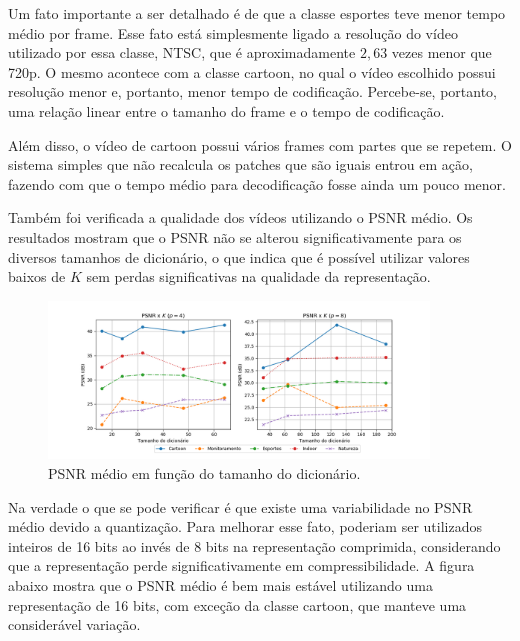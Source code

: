 \documentclass[cic,tc]{iiufrgs}
\begin{document}
Um fato importante a ser detalhado é de que a classe esportes teve menor tempo médio por frame.
Esse fato está simplesmente ligado a resolução do vídeo utilizado por essa classe, NTSC, que é 
aproximadamente $2,63$ vezes menor que 720p.
O mesmo acontece com a classe cartoon, no qual o vídeo escolhido possui resolução menor e, portanto,
menor tempo de codificação.
Percebe-se, portanto, uma relação linear entre o tamanho do frame e o tempo de codificação.

Além disso, o vídeo de cartoon possui vários frames com partes que se repetem.
O sistema simples que não recalcula os patches que são iguais entrou em ação, fazendo com que 
o tempo médio para decodificação fosse ainda um pouco menor.

Também foi verificada a qualidade dos vídeos utilizando o PSNR médio. 
Os resultados mostram que o PSNR não se alterou significativamente para os diversos tamanhos
de dicionário, o que indica que é possível utilizar valores baixos de $K$ sem perdas significativas
na qualidade da representação.

\begin{figure}[H]
    \caption{PSNR médio em função do tamanho do dicionário.}
    \begin{center}
        \includegraphics[width=0.9\textwidth]{img/graficos/ds_psnr.png}
    \end{center}
    \label{fig:psnr8bit}
\end{figure}

Na verdade o que se pode verificar é que existe uma variabilidade no PSNR médio devido 
a quantização.
Para melhorar esse fato, poderiam ser utilizados inteiros de 16 bits ao invés de 8 bits na 
representação comprimida, considerando que a representação perde significativamente em 
compressibilidade.
A figura abaixo mostra que o PSNR médio é bem mais estável utilizando uma representação 
de 16 bits, com exceção da classe cartoon, que manteve uma considerável variação.
\end{document}
